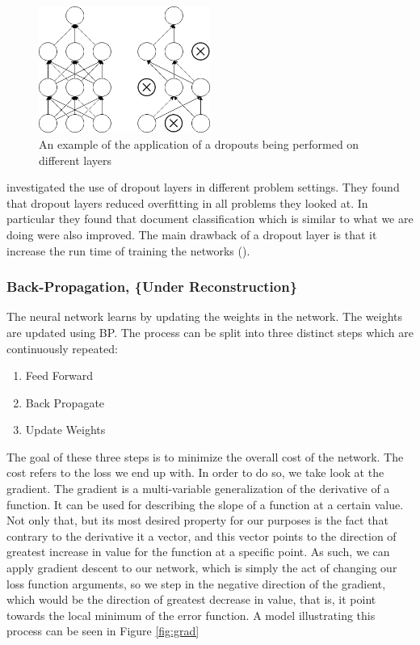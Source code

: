 \begin{description}
        \begin{figure}
        \centering
        \includegraphics[width=0.5\textwidth]{./pictures/method/Dropout.png}
        \caption{An example of the application of a dropouts being performed
            on different layers}
        \label{fig:dropout}
        \end{figure}

        \cite{JMLR:v15:srivastava14a} investigated the use of dropout layers
        in different problem settings. They found that dropout layers reduced
        overfitting in all problems they looked at. In particular they found
        that document classification which is similar to what we are doing were
        also improved. The main drawback of a dropout layer is that it increase
        the run time of training the networks (\cite{JMLR:v15:srivastava14a}).

\end{description}

\subsubsection{Back-Propagation, \{Under Reconstruction\}}\label{sec:BP}

The neural network learns by updating the weights in the network. The weights
are updated using \gls{BP}. The process can be split into three distinct steps
which are continuously repeated:

\begin{enumerate}
    \item Feed Forward
    \item Back Propagate
    \item Update Weights
\end{enumerate}

The goal of these three steps is to minimize the overall cost of the network.
The cost refers to the loss we end up with. In order to do so, we take look at
the gradient. The gradient is a multi-variable generalization of the derivative
of a function. It can be used for describing the slope of a function at a
certain value. Not only that, but its most desired property for our purposes is
the fact that contrary to the derivative it a vector, and this vector points
to the direction of greatest increase in value for the function at a specific
point. As such, we can apply gradient descent to our network, which is simply
the act of changing our loss function arguments, so we step in the negative
direction of the gradient, which would be the direction of greatest decrease
in value, that is, it point towards the local minimum of the error function. A
model illustrating this process can be seen in Figure \ref{fig:grad}

